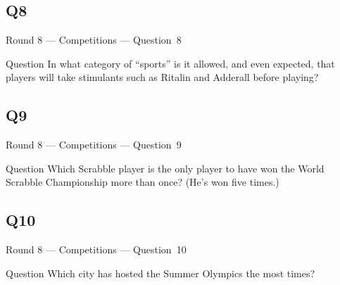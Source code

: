 \documentclass[11pt]{beamer}
\begin{document}
\subsection*{Q8}
\begin{frame}[t]{Round 8 --- Competitions --- \mbox{Question 8}}
\vspace{-0.5em}
\begin{block}{Question}
In what category of ``sports'' is it allowed, and even expected, that players will take stimulants such as Ritalin and Adderall before playing?
\end{block}
\end{frame}
\subsection*{Q9}
\begin{frame}[t]{Round 8 --- Competitions --- \mbox{Question 9}}
\vspace{-0.5em}
\begin{block}{Question}
Which Scrabble player is the only player to have won the World Scrabble Championship more than once? (He's won five times.)
\end{block}
\end{frame}
\subsection*{Q10}
\begin{frame}[t]{Round 8 --- Competitions --- \mbox{Question 10}}
\vspace{-0.5em}
\begin{block}{Question}
Which city has hosted the Summer Olympics the most times?
\end{block}
\end{frame}
\end{document}
